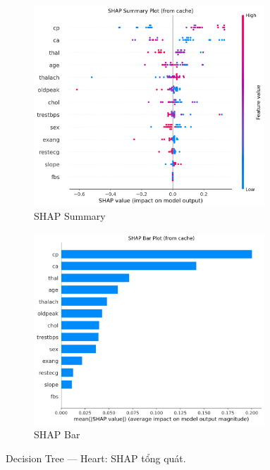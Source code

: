 \begin{figure}[H]
\centering
\begin{subfigure}[b]{0.48\textwidth}\centering
\includegraphics[width=0.95\textwidth]{Result/heart_dataset/DT/SHAP/Summary.png}
\caption{SHAP Summary}\label{fig:dt_heart_shap_summary}
\end{subfigure}\hfill
\begin{subfigure}[b]{0.48\textwidth}\centering
\includegraphics[width=0.95\textwidth]{Result/heart_dataset/DT/SHAP/Bar.png}
\caption{SHAP Bar}\label{fig:dt_heart_shap_bar}
\end{subfigure}
\caption{Decision Tree — Heart: SHAP tổng quát.}
\label{fig:dt_heart_shap_overview}
\end{figure}

